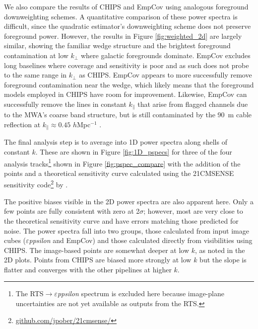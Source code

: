 \documentclass[twolcolumn,iop]{emulateapj}
\def\eppsilon{{\it $\varepsilon$ppsilon}}
\def\empirical{EmpCov}
\def\dilloncite{\cite{PhysRevD.91.123011} }
\begin{document}
We also compare the results of CHIPS and \empirical{} using analogous foreground downweighting schemes. A quantitative comparison of these power spectra is difficult, since the quadratic estimator's downweighting scheme does not preserve foreground power. However, the results in Figure \ref{fig:weighted_2d} are largely similar, showing the familiar wedge structure and the brightest foreground contamination at low $k_\perp$ where galactic foregrounds dominate. \empirical{} excludes long baselines where coverage and sensitivity is poor and as such does not probe to the same range in $k_\perp$ as CHIPS. \empirical{} appears to more successfully remove foreground contamination near the wedge, which likely means that the foreground models employed in CHIPS have room for improvement. Likewise, \empirical{} can successfully remove the lines in constant $k_\parallel$ that arise from flagged channels due to the MWA's coarse band structure, but is still contaminated by the 90~m cable reflection at $k_\parallel \approx 0.45$ $h$Mpc$^{-1}$ \cite{dilloncite}.



The final analysis step is to average into 1D power spectra along shells of constant $k$. These are shown in Figure \ref{fig:1D_pspecs} for three of the four analysis tracks\footnote{The RTS$\to$\eppsilon{} spectrum is excluded here because image-plane uncertainties are not yet available as outputs from the RTS.} shown in Figure \ref{fig:pspec_compare} with the addition of the \dilloncite{} points and a theoretical sensitivity curve calculated using the 21CMSENSE sensitivity code\footnote{\url{github.com/jpober/21cmsense/}} by \cite{Pober:2014p10390}.

The positive biases visible in the 2D power spectra are also apparent here. Only a few points are fully consistent with zero at 2$\sigma$; however, most are very close to the theoretical sensitivity curve and have errors matching those predicted for noise.
 The power spectra fall into two groups, those calculated from input image cubes (\eppsilon{} and \empirical{}) and those calculated directly from visibilities using CHIPS. The image-based points are somewhat deeper at low $k$, as noted in the 2D plots.  Points from CHIPS are biased more strongly at low $k$ but the slope is flatter and converges with the other pipelines at higher $k$.  
\end{document}
